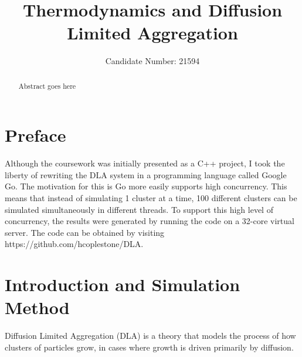 \documentclass[11pt]{iopart}
\begin{document}
\setlength{\marginparwidth}{1.5cm}

\title[]{Thermodynamics and Diffusion Limited Aggregation}

\author{Candidate Number: 21594}

\address{Department of Physics,
University of Bath, Bath BA2 7AY, United Kingdom}
\begin{abstract}
Abstract goes here
\end{abstract}

\listoftodos


\section*{Preface}
Although the coursework was initially presented as a C++ project, I took the liberty of rewriting the DLA system in a programming language called Google Go. The motivation for this is Go more easily supports high concurrency. This means that instead of simulating 1 cluster at a time, 100 different clusters can be simulated simultaneously in different threads. To support this high level of concurrency, the results were generated by running the code on a 32-core virtual server. The code can be obtained by visiting https://github.com/hcoplestone/DLA.

\section{Introduction and Simulation Method}

Diffusion Limited Aggregation (DLA) is a theory that models the process of how clusters of particles grow, in cases where growth is driven primarily by diffusion. \cite{dla}
\end{document}
